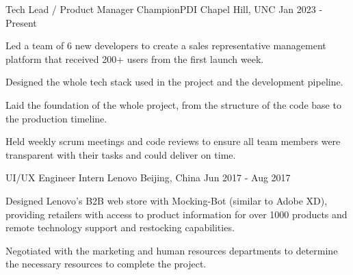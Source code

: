 \begin{cventries}
    \cventry
    {Tech Lead / Product Manager} %
    {ChampionPDI} %
    {Chapel Hill, UNC} %
    {Jan 2023 - Present} %
    {
      \begin{cvitems} %
        \item {Led a team of 6 new developers to create a sales representative management platform that received 200+ users from the first launch week.}
        \item {Designed the whole tech stack used in the project and the development pipeline.}
        \item {Laid the foundation of the whole project, from the structure of the code base to the production timeline.}
        \item {Held weekly scrum meetings and code reviews to ensure all team members were transparent with their tasks and could deliver on time.}
      \end{cvitems}
    }

    \cventry
    {UI/UX Engineer Intern} %
    {Lenovo} %
    {Beijing, China} %
    {Jun 2017 - Aug 2017} %
    {
      \begin{cvitems} %
        \item {Designed Lenovo's B2B web store with Mocking-Bot (similar to Adobe XD), providing retailers with access to product information for over 1000 products and remote technology support and restocking capabilities.}
        \item {Negotiated with the marketing and human resources departments to determine the necessary resources to complete the project.}
      \end{cvitems}
    }
    
    

\end{cventries}
